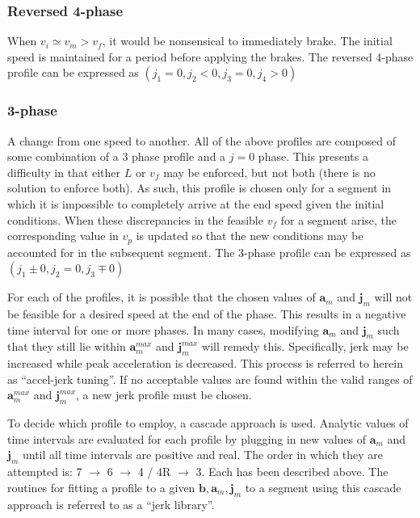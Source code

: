 \documentclass[letterpaper, 10 pt, conference]{ieeeconf}  %
\begin{document}
\subsubsection{Reversed 4-phase} \label{sec:reversed4phase}

When $v_i \simeq v_m > v_f$, it would be nonsensical to immediately brake.
The initial speed is maintained for a period before applying the brakes.
The reversed 4-phase profile can be expressed as $( j_1 = 0, j_2 < 0, j_3 = 0 , j_4 > 0 )$

\subsubsection{3-phase} \label{sec:3phase}

A change from one speed to another.
All of the above profiles are composed of some combination of a 3 phase profile and a $j = 0$ phase.
This presents a difficulty in that either $L$ or $v_f$ may be enforced, but not both (there is no solution to enforce both).
As such, this profile is chosen only for a segment in which it is impossible to completely arrive at the end speed given the initial conditions.
When these discrepancies in the feasible $v_f$ for a segment arise, the corresponding value in $v_p$ is updated so that the new conditions may be accounted for in the subsequent segment.
The 3-phase profile can be expressed as $(j_1 \pm 0 , j_2 = 0, j_3 \mp 0 )$

For each of the profiles, it is possible that the chosen values of $\mathbf{a}_m$ and $\mathbf{j}_m$ will not be feasible for a desired speed at the end of the phase.
This results in a negative time interval for one or more phases.
In many cases, modifying $\mathbf{a}_m$ and $\mathbf{j}_m$ such that they still lie within $\mathbf{a}^{max}_m$ and $\mathbf{j}^{max}_m$ will remedy this.
Specifically, jerk may be increased while peak acceleration is decreased.
This process is referred to herein as ``accel-jerk tuning''.
If no acceptable values are found within the valid ranges of $\mathbf{a}^{max}_m$ and $\mathbf{j}^{max}_m$, a new jerk profile must be chosen.

To decide which profile to employ, a cascade approach is used.
Analytic values of time intervals are evaluated for each profile by plugging in new values of $\mathbf{a}_m$ and $\mathbf{j}_m$ until all time intervals are positive and real.
The order in which they are attempted is: 7 $\rightarrow$ 6 $\rightarrow$ 4 / 4R $\rightarrow$ 3.
Each has been described above.
The routines for fitting a profile to a given $\mathbf{b}, \mathbf{a}_m, \mathbf{j}_m$ to a segment using this cascade approach is referred to as a ``jerk library''.
\end{document}
